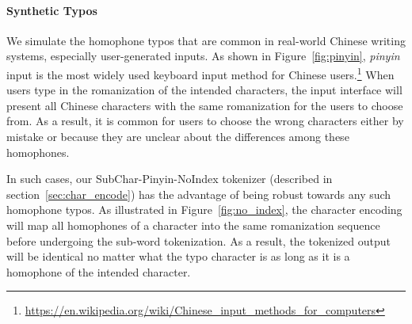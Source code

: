 \paragraph{Synthetic Typos}
We simulate the homophone typos that are common in real-world Chinese writing systems, especially user-generated inputs. As shown in Figure~\ref{fig:pinyin}, \textit{pinyin} input is the most widely used keyboard input method for Chinese users.\footnote{\url{https://en.wikipedia.org/wiki/Chinese_input_methods_for_computers}} When users type in the romanization of the intended characters, the input interface will present all Chinese characters with the same romanization for the users to choose from. As a result, it is common for users to choose the wrong characters either by mistake or because they are unclear about the differences among these homophones. 


In such cases, our SubChar-Pinyin-NoIndex tokenizer (described in section~\ref{sec:char_encode}) has the advantage of being robust towards any such homophone typos. As illustrated in Figure~\ref{fig:no_index}, the character encoding will map all homophones of a character into the same romanization sequence before undergoing the sub-word tokenization. As a result, the tokenized output will be identical no matter what the typo character is as long as it is a homophone of the intended character.


